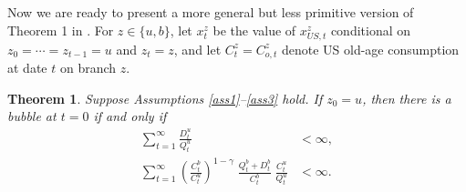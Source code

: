 \documentclass[12pt]{article}
\theoremstyle{plain}
\newtheorem{thm}{Theorem}
\begin{document}
Now we are ready to present a more general but less primitive version of Theorem 1 in \citet{hirano2025technological}.
For $z\in\{u,b\}$, let $x_t^z$ be the value of $x_{US,t}^z$ conditional on $z_0=\cdots=z_{t-1}=u$ and $z_t=z$,
and let $C_t^z=C_{o,t}^z$ denote US old-age consumption at date $t$ on branch $z$.

\begin{thm}\label{thm_1}
Suppose Assumptions \ref{ass1}--\ref{ass3} hold. If $z_0=u$, then there is a bubble at $t=0$ if and only if
\begin{subequations}\label{thm_cond1}
\begin{align}
\sum_{t=1}^\infty \frac{D_t^u}{Q_t^u}&<\infty, \label{thm_cond_1a}\\
\sum_{t=1}^\infty
\left(\frac{C_t^b}{C_t^u}\right)^{1-\gamma}\;
\frac{Q_t^b+D_t^b}{C_t^b}\;
\frac{C_t^u}{Q_t^u}&<\infty. \label{thm_cond_1b}
\end{align}
\end{subequations}
\end{thm}
\end{document}
